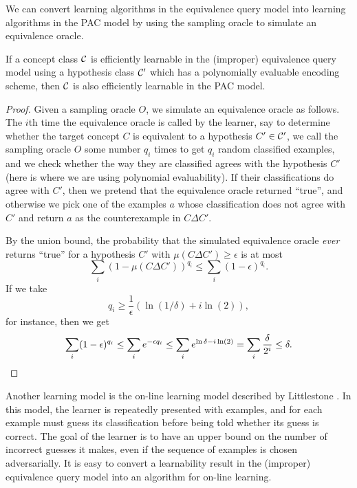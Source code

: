 \documentclass[letterpaper,11pt]{article}
\begin{document}
We can convert learning algorithms in the equivalence query model into learning algorithms in the PAC model by using the sampling oracle to simulate an equivalence oracle.

\begin{prop} If a concept class $\mathcal{C}$ is efficiently learnable in the (improper) equivalence query model using a hypothesis class $\mathcal{C}'$ which has a polynomially evaluable encoding scheme, then $\mathcal{C}$ is also efficiently learnable in the PAC model.
\end{prop}
\begin{proof} Given a sampling oracle $O$, we simulate an equivalence oracle as follows. The $i$th time the equivalence oracle is called by the learner, say to determine whether the target concept $C$ is equivalent to a hypothesis $C' \in \mathcal{C}'$, we call the sampling oracle $O$ some number $q_i$ times to get $q_i$ random classified examples, and we check whether the way they are classified agrees with the hypothesis $C'$ (here is where we are using polynomial evaluability). If their classifications do agree with $C'$, then we pretend that the equivalence oracle returned ``true'', and otherwise we pick one of the examples $a$ whose classification does not agree with $C'$ and return $a$ as the counterexample in $C \Delta C'$.

By the union bound, the probability that the simulated equivalence oracle \emph{ever} returns ``true'' for a hypothesis $C'$ with $\mu(C\Delta C') \ge \epsilon$ is at most
\[
\sum_i (1-\mu(C\Delta C'))^{q_i} \le \sum_i (1-\epsilon)^{q_i}.
\]
If we take
\[
q_i \ge \frac{1}{\epsilon}(\ln(1/\delta) + i\ln(2)),
\]
for instance, then we get
\[
\sum_i (1-\epsilon)^{q_i} \le \sum_i e^{-\epsilon q_i} \le \sum_i e^{\ln \delta - i\ln(2)} = \sum_i \frac{\delta}{2^i} \le \delta.\qedhere
\]
\end{proof}

\begin{rem} Another learning model is the on-line learning model described by Littlestone \cite{littlestone-online-learning}. In this model, the learner is repeatedly presented with examples, and for each example must guess its classification before being told whether its guess is correct. The goal of the learner is to have an upper bound on the number of incorrect guesses it makes, even if the sequence of examples is chosen adversarially. It is easy to convert a learnability result in the (improper) equivalence query model into an algorithm for on-line learning.
\end{rem}
\end{document}
